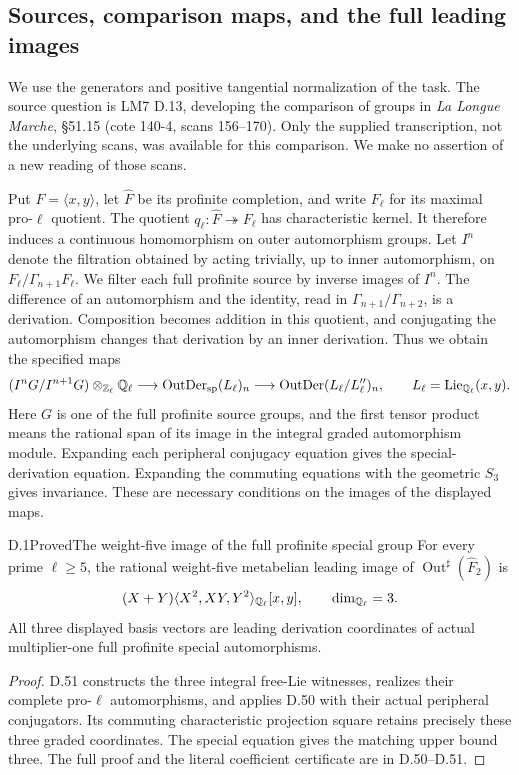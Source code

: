 \subsection{Sources, comparison maps, and the full leading images}

We use the generators and positive tangential normalization of the task.
The source question is LM7 D.13, developing the comparison of groups in
\emph{La Longue Marche}, \S51.15 (cote 140-4, scans 156--170).
Only the supplied transcription, not the underlying scans, was available
for this comparison. We make no assertion of a new reading of those scans.

Put $F=\langle x,y\rangle$, let $\widehat F$ be its profinite completion,
and write $F_\ell$ for its maximal pro-$\ell$ quotient. The quotient
$q_\ell:\widehat F\twoheadrightarrow F_\ell$ has characteristic kernel.
It therefore induces a continuous homomorphism on outer automorphism
groups. Let $I^n$ denote the filtration obtained by acting trivially,
up to inner automorphism, on $F_\ell/\Gamma_{n+1}F_\ell$.
We filter each full profinite source by inverse images of $I^n$.
The difference of an automorphism and the identity, read in
$\Gamma_{n+1}/\Gamma_{n+2}$, is a derivation. Composition becomes addition
in this quotient, and conjugating the automorphism changes that
derivation by an inner derivation. Thus we obtain the specified maps
\[
 (I^nG/I^{n+1}G)\otimes_{\mathbb Z_\ell}\mathbb Q_\ell
 \longrightarrow \operatorname{OutDer}_{\mathrm{sp}}(L_\ell)_n
 \longrightarrow \operatorname{OutDer}(L_\ell/L_\ell'')_n,
 \qquad L_\ell=\operatorname{Lie}_{\mathbb Q_\ell}(x,y).
\]
Here $G$ is one of the full profinite source groups, and the first
tensor product means the rational span of its image in the integral
graded automorphism module. Expanding each peripheral conjugacy equation
gives the special-derivation equation. Expanding the commuting equations
with the geometric $S_3$ gives invariance. These are necessary conditions
on the images of the displayed maps.

\begin{statement}{D.1}{Proved}{The weight-five image of the full profinite special group}
For every prime $\ell\geq5$, the rational weight-five metabelian
leading image of $\operatorname{Out}^{\sharp}(\widehat F_2)$ is
\[
 (X+Y)\langle X^2,XY,Y^2\rangle_{\mathbb Q_\ell}[x,y],
 \qquad\dim_{\mathbb Q_\ell}=3.
\]
All three displayed basis vectors are leading derivation coordinates
of actual multiplier-one full profinite special automorphisms.
\end{statement}
\begin{proof}
D.51 constructs the three integral free-Lie witnesses, realizes their
complete pro-$\ell$ automorphisms, and applies D.50 with their actual
peripheral conjugators. Its commuting characteristic projection square
retains precisely these three graded coordinates. The special equation
gives the matching upper bound three. The full proof and the literal
coefficient certificate are in D.50--D.51.
\end{proof}

